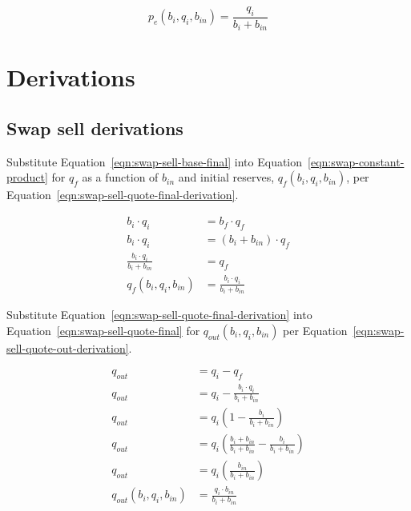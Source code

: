 \documentclass[table, twocolumn]{article}
\begin{document}
\begin{equation}\label{eqn:swap-sell-execution-price-solved}
	p_e (b_i, q_i, b_{in}) = \frac{q_i}{b_i + b_{in}}
\end{equation}

\section{Derivations}\label{sec:derivations}

\subsection{Swap sell derivations}\label{ssec:swap-sell-derivations}

Substitute Equation~\ref{eqn:swap-sell-base-final} into
Equation~\ref{eqn:swap-constant-product} for $q_f$ as a function of $b_{in}$ and
initial reserves, $q_f(b_i, q_i, b_{in})$, per
Equation~\ref{eqn:swap-sell-quote-final-derivation}.

\begin{align}\label{eqn:swap-sell-quote-final-derivation}
	b_i \cdot q_i                      & = b_f \cdot q_f \nonumber            \\
	b_i \cdot q_i                      & = (b_i + b_{in}) \cdot q_f \nonumber \\
	\frac{b_i \cdot q_i}{b_i + b_{in}} & = q_f \nonumber                      \\
	q_f(b_i, q_i, b_{in})              & = \frac{b_i \cdot q_i}{b_i + b_{in}}
\end{align}

Substitute Equation~\ref{eqn:swap-sell-quote-final-derivation} into
Equation~\ref{eqn:swap-sell-quote-final} for $q_{out}(b_i, q_i, b_{in})$
per Equation~\ref{eqn:swap-sell-quote-out-derivation}.

\begin{align}\label{eqn:swap-sell-quote-out-derivation}
	q_{out}                    & = q_i - q_f \nonumber                                \\
	q_{out}                    & = q_i - \frac{b_i \cdot q_i}{b_i + b_{in}} \nonumber \\
	q_{out}                    & =
	q_i \left( 1 - \frac{b_i}{b_i + b_{in}} \right) \nonumber                         \\
	q_{out}                    & = q_i \left(
	\frac{b_i + b_{in}}{b_i + b_{in}} - \frac{b_i}{b_i + b_{in}}
	\right) \nonumber                                                                 \\
	q_{out}                    & =
	q_i \left( \frac{b_{in}}{b_i + b_{in}} \right) \nonumber                          \\
	q_{out} (b_i, q_i, b_{in}) & = \frac{q_i \cdot b_{in}}{b_i + b_{in}}
\end{align}
\end{document}
